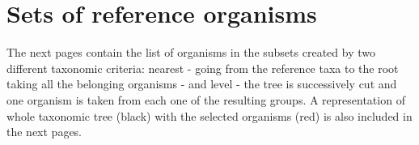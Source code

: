 \chapter{Sets of reference organisms}
\label{appendixdorota}
The next pages contain the list of organisms in the subsets created by two different taxonomic criteria: nearest - going from the reference taxa to the root taking all the belonging organisms - and level - the tree is successively cut and one organism is taken from each one of the resulting groups. A representation of whole taxonomic tree (black) with the selected organisms (red) is also included in the next pages.



